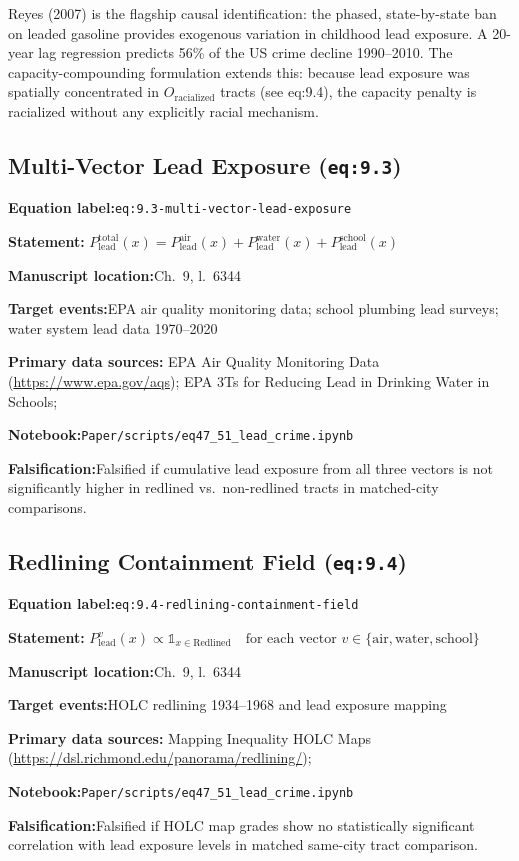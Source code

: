 \documentclass[12pt]{article}
\newcommand{\TierOne}{\textcolor{green!60!black}{\textbf{T1}}}
\newcommand{\caserow}[2]{%
  \noindent\textbf{#1:}\enspace #2\par\smallskip}
\begin{document}
Reyes (2007) is the flagship causal identification: the phased, 
state-by-state ban on leaded gasoline provides exogenous variation in 
childhood lead exposure.  A 20-year lag regression predicts 56\% of 
the US crime decline 1990--2010.  The capacity-compounding formulation 
extends this: because lead exposure was spatially concentrated in 
$O_{\text{racialized}}$ tracts (see eq:9.4), the capacity penalty is 
racialized without any explicitly racial mechanism.

\subsection{Multi-Vector Lead Exposure (\texttt{eq:9.3})}

\begin{tcolorbox}[caseblock, title={%
  \TierOne\quad Multi-Vector Lead Exposure}]

\caserow{Equation label}{\texttt{eq:9.3-multi-vector-lead-exposure}}
\caserow{Statement}{%
  $P_{\text{lead}}^{\text{total}}(x) =
   P_{\text{lead}}^{\text{air}}(x)
   + P_{\text{lead}}^{\text{water}}(x)
   + P_{\text{lead}}^{\text{school}}(x)$}
\caserow{Manuscript location}{Ch.~9, l.~6344}
\caserow{Target events}{EPA air quality monitoring data; school
  plumbing lead surveys; water system lead data 1970--2020}
\caserow{Primary data sources}{%
  EPA Air Quality Monitoring Data (\url{https://www.epa.gov/aqs});
  EPA 3Ts for Reducing Lead in Drinking Water in Schools;
  \textcite{rothstein}}
\caserow{Notebook}{\texttt{Paper/scripts/eq47\_51\_lead\_crime.ipynb}}
\caserow{Falsification}{Falsified if cumulative lead exposure from all
  three vectors is not significantly higher in redlined vs.\
  non-redlined tracts in matched-city comparisons.}

\end{tcolorbox}

\subsection{Redlining Containment Field (\texttt{eq:9.4})}

\begin{tcolorbox}[caseblock, title={%
  \TierOne\quad Redlining Containment Field}]

\caserow{Equation label}{\texttt{eq:9.4-redlining-containment-field}}
\caserow{Statement}{%
  $P_{\text{lead}}^{v}(x) \propto
   \mathbb{1}_{x \in \text{Redlined}}
   \quad\text{for each vector }
   v\in\{\text{air},\text{water},\text{school}\}$}
\caserow{Manuscript location}{Ch.~9, l.~6344}
\caserow{Target events}{HOLC redlining 1934--1968 and lead
  exposure mapping}
\caserow{Primary data sources}{%
  Mapping Inequality HOLC Maps
  (\url{https://dsl.richmond.edu/panorama/redlining/});
  \textcite{rothstein}}
\caserow{Notebook}{\texttt{Paper/scripts/eq47\_51\_lead\_crime.ipynb}}
\caserow{Falsification}{Falsified if HOLC map grades show no statistically
  significant correlation with lead exposure levels in matched
  same-city tract comparison.}

\end{tcolorbox}
\end{document}
